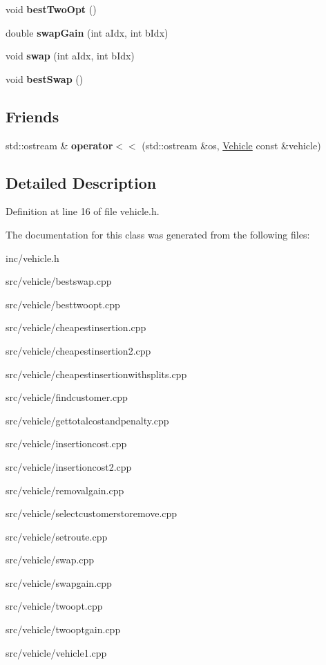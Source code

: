 \begin{DoxyCompactItemize}
void {\bfseries best\+Two\+Opt} ()
\item 
\mbox{\label{class_vehicle_a738c59dd2399d2bc1198db5e44be3db9}} 
double {\bfseries swap\+Gain} (int a\+Idx, int b\+Idx)
\item 
\mbox{\label{class_vehicle_a5ba7b2efd185ad5b567146c5249a3465}} 
void {\bfseries swap} (int a\+Idx, int b\+Idx)
\item 
\mbox{\label{class_vehicle_ae3da9e9bc42637d5f8d2beac2cf93ef3}} 
void {\bfseries best\+Swap} ()
\end{DoxyCompactItemize}
\subsection*{Friends}
\begin{DoxyCompactItemize}
\item 
\mbox{\label{class_vehicle_a03fb689e9f7599db1bb3e86d7b587998}} 
std\+::ostream \& {\bfseries operator$<$$<$} (std\+::ostream \&os, \hyperlink{class_vehicle}{Vehicle} const \&vehicle)
\end{DoxyCompactItemize}


\subsection{Detailed Description}


Definition at line 16 of file vehicle.\+h.



The documentation for this class was generated from the following files\+:\begin{DoxyCompactItemize}
\item 
inc/vehicle.\+h\item 
src/vehicle/bestswap.\+cpp\item 
src/vehicle/besttwoopt.\+cpp\item 
src/vehicle/cheapestinsertion.\+cpp\item 
src/vehicle/cheapestinsertion2.\+cpp\item 
src/vehicle/cheapestinsertionwithsplits.\+cpp\item 
src/vehicle/findcustomer.\+cpp\item 
src/vehicle/gettotalcostandpenalty.\+cpp\item 
src/vehicle/insertioncost.\+cpp\item 
src/vehicle/insertioncost2.\+cpp\item 
src/vehicle/removalgain.\+cpp\item 
src/vehicle/selectcustomerstoremove.\+cpp\item 
src/vehicle/setroute.\+cpp\item 
src/vehicle/swap.\+cpp\item 
src/vehicle/swapgain.\+cpp\item 
src/vehicle/twoopt.\+cpp\item 
src/vehicle/twooptgain.\+cpp\item 
src/vehicle/vehicle1.\+cpp\end{DoxyCompactItemize}

